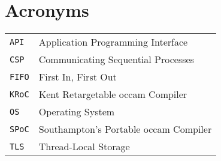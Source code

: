 
\chapter{Acronyms}

\begin{table}[h!]
    \centering
    \begin{tabular}{ll}
        \texttt{API}  & Application Programming Interface \\
        \texttt{CSP}  & Communicating Sequential Processes \\
        \texttt{FIFO} & First In, First Out \\
        \texttt{KRoC} & Kent Retargetable occam Compiler \\
        \texttt{OS}   & Operating System \\
        \texttt{SPoC} & Southampton's Portable occam Compiler \\
        \texttt{TLS}  & Thread-Local Storage
    \end{tabular}
\end{table}
